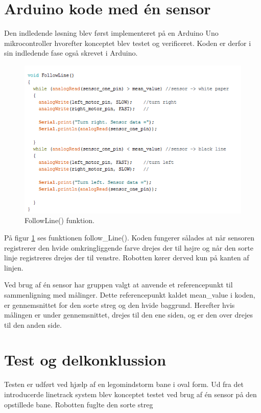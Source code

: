 \section{Arduino kode med én sensor}
Den indledende løsning blev først implementeret på en Arduino Uno mikrocontroller hvorefter konceptet blev testet og verificeret. Koden er derfor i sin indledende fase også skrevet i Arduino.

\begin{figure}[h!]
  \centering
  \includegraphics[width=1.0\textwidth]{figures/followLine2.png}
  \caption{FollowLine() funktion.}
  \label{follow_line_kode}
\end{figure}

På figur \ref{follow_line_kode} ses funktionen follow\_Line(). Koden fungerer sålades at når sensoren registrerer den hvide omkringliggende farve drejes der til højre og når den sorte linje registreres drejes der til venstre. Robotten kører derved kun på kanten af linjen. 

Ved brug af én sensor har gruppen valgt at anvende et referencepunkt til sammenligning med målinger. Dette referencepunkt kaldet mean\_value i koden, er gennemsnittet for den sorte streg og den hvide baggrund. Herefter hvis målingen er under gennemsnittet, drejes til den ene siden, og er den over drejes til den anden side.
\newpage



\section{Test og delkonklussion}
Testen er udført ved hjælp af en legomindstorm bane i oval form.
Ud fra det introducerde linetrack system blev konceptet testet ved brug af én sensor på den opstillede bane. 
\newline
Robotten fuglte den sorte streg 

